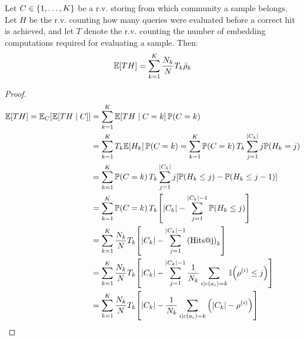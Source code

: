 \begin{lemma}
    \label{lemma:expected_evaluations}
    Let $C \in \mathopen{}\left\{1,\dots,K\right\}$ be a r.v. storing from which community a sample belongs. Let $H$ be the r.v. counting how many queries were evaluated before a correct hit is achieved, and let $T$ denote the r.v. counting the number of embedding computations required for evaluating a sample. Then:
    \begin{equation}
    \mathbb{E}\mathopen{}\left[T H\right] = \sum_{k=1}^{K}{\frac{N_k}{N} T_k \bar{\rho}_k}
    \end{equation}
\end{lemma}
\begin{proof}
    \begin{align}
    \begin{split}
        \mathbb{E}\off{T H} = \mathbb{E}_{C}\off{\mathbb{E}\off{T H \mid C}}%
        &= \sum_{k=1}^{K}{\mathbb{E}\off{T H \mid C=k} \mathbb{P}\of{C=k}}%
        \\
        &= \sum_{k=1}^{K}{T_k \mathbb{E}\off{H_k} \mathbb{P}\of{C=k}}%
        = \sum_{k=1}^{K}{\mathbb{P}\of{C=k} T_k \sum_{j=1}^{\abs{C_k}}{j \mathbb{P}\of{H_k=j}}}%
        \\
        &= \sum_{k=1}^{K}{\mathbb{P}\of{C=k} T_k \sum_{j=1}^{\abs{C_k}}{j \off{\mathbb{P}\of{H_k \leq j} - \mathbb{P}\of{H_k \leq j-1}}}}%
        \\
        &= \sum_{k=1}^{K}{\mathbb{P}\of{C=k} T_k \off{\abs{C_k}- \sum_{j=1}^{\abs{C_k}-1}{\mathbb{P}\of{H_k \leq j}}}}%
        \\
        &= \sum_{k=1}^{K}{\frac{N_k}{N} T_k \off{\abs{C_k}- \sum_{j=1}^{\abs{C_k}-1}{\of{\text{Hits@j}}_k}}}%
        \\
        &= \sum_{k=1}^{K}{\frac{N_k}{N} T_k \off{\abs{C_k}- \sum_{j=1}^{\abs{C_k}-1}{\frac{1}{N_k}\sum_{i \mid c\of{a_i}=k}{\mathbb{I}\of{\rho^{\of{i}} \leq j}}}}}%
        \\
        &= \sum_{k=1}^{K}{\frac{N_k}{N} T_k \off{\abs{C_k}- \frac{1}{N_k}\sum_{i \mid c\of{a_i}=k}{\of{\abs{C_k}- \rho^{\of{i}}}}}}%
        \\

\end{split}
\end{align}
\end{proof}
